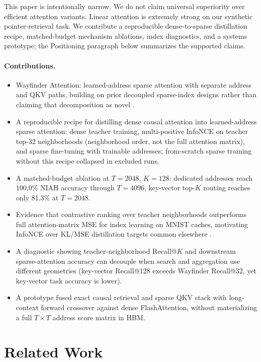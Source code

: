 \documentclass{article}
\begin{document}
This paper is intentionally narrow. We do not claim universal superiority over efficient attention variants. Linear attention is extremely strong on our synthetic pointer-retrieval task. We contribute a reproducible dense-to-sparse distillation recipe, matched-budget mechanism ablations, index diagnostics, and a systems prototype; the Positioning paragraph below summarizes the supported claims.

\paragraph{Contributions.}
\begin{itemize}
    \item Wayfinder Attention: learned-address sparse attention with separate address and QKV paths, building on prior decoupled sparse-index designs rather than claiming that decomposition as novel \cite{sun2022lha,deepseek2025v32,desai2025hashattention}.
    \item A reproducible recipe for distilling dense causal attention into learned-address sparse attention: dense teacher training, multi-positive InfoNCE on teacher top-32 neighborhoods (neighborhood order, not the full attention matrix), and sparse fine-tuning with trainable addresses; from-scratch sparse training without this recipe collapsed in excluded runs.
    \item A matched-budget ablation at $T{=}2048$, $K{=}128$: dedicated addresses reach 100.0\% NIAH accuracy through $T{=}4096$; key-vector top-$K$ routing reaches only 81.3\% at $T{=}2048$.
    \item Evidence that contrastive ranking over teacher neighborhoods outperforms full attention-matrix MSE for index learning on MNIST caches, motivating InfoNCE over KL/MSE distillation targets common elsewhere \cite{deepseek2025v32,gao2024seerattention,sundarapandiyan2025fsa}.
    \item A diagnostic showing teacher-neighborhood Recall@$K$ and downstream sparse-attention accuracy can decouple when search and aggregation use different geometries (key-vector Recall@128 exceeds Wayfinder Recall@32, yet key-vector task accuracy is lower).
    \item A prototype fused exact causal retrieval and sparse QKV stack with long-context forward crossover against dense FlashAttention, without materializing a full $T \times T$ address score matrix in HBM.
\end{itemize}

\section{Related Work}
\end{document}
